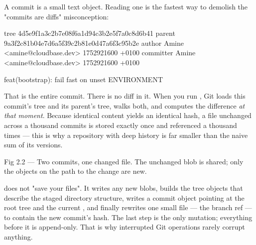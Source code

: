  A commit is a small text object. Reading one is the fastest way to demolish the "commits are diffs" misconception:

\begin{outbox}
tree 4d5e9f1a3c2b7e08f6a1d94c3b2e5f7a0c8d6b41
parent 9a3f2c81b04e7d6a5f39c2b81e0d47a6f3c95b2e
author  Amine <amine@cloudbase.dev> 1752921600 +0100
committer Amine <amine@cloudbase.dev> 1752921600 +0100

feat(bootstrap): fail fast on unset ENVIRONMENT
\end{outbox}

That is the entire commit. There is no diff in it. When you run , Git loads this commit's tree and its parent's tree, walks both, and computes the difference \emph{at that moment}. Because identical content yields an identical hash, a file unchanged across a thousand commits is stored exactly once and referenced a thousand times --- this is why a repository with deep history is far smaller than the naive sum of its versions.

\begin{wbfigure}{Fig 2.2 — Two commits, one changed file. The unchanged blob is shared; only the objects on the path to the change are new.}
\end{wbfigure}

\begin{behind}
 does not "save your files". It writes any new blobs, builds the tree objects that describe the staged directory structure, writes a commit object pointing at the root tree and the current , and finally rewrites one small file --- the branch ref --- to contain the new commit's hash. The last step is the only mutation; everything before it is append-only. That is why interrupted Git operations rarely corrupt anything.
\end{behind}

